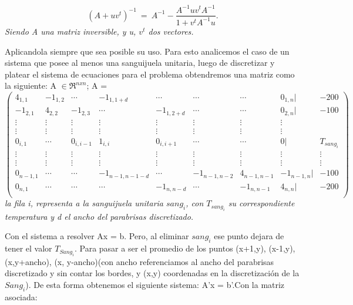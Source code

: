 \begin{equation}
	(A+ uv^t)^{-1} \ =\ A^{-1} - \frac{ A^{-1} u v^t A^{-1} }{1+v^t A^{-1}u}.\label{eq:sm}
\end{equation} 
\textit{Siendo A una matriz inversible, y u, $v^t$ dos vectores.}


Aplicandola siempre que sea posible su uso. Para esto analicemos el caso de un sistema que posee al menos una sanguijuela unitaria, luego de discretizar y platear el sistema de ecuaciones para el problema obtendremos una matriz como la siguiente:
A $\in \Re ^{nxn}$; A =
$$
 \begin{pmatrix}
  4_{1,1} & -1_{1,2} & \cdots & -1_{1,1+d} & \cdots & \cdots & \cdots & 0_{1,n} | & -200 \\
   -1_{2,1} & 4_{2,2} & -1_{2,3} & \cdots & -1_{1,2+d} & \cdots & \cdots  & 0_{2,n} | & -100 \\
  \vdots  & \vdots  & \vdots & \vdots  & \vdots & \vdots  & \vdots & \vdots \\
  \vdots  & \vdots & \vdots & \vdots  & \vdots & \vdots  & \vdots & \vdots \\
   0_{i,1} & \cdots & 0_{i,i-1} & 1_{i,i} &  0_{i,i+1} & \cdots & \cdots & 0 | & T_{sang_i} \\
  \vdots  & \vdots  & \vdots & \vdots  & \vdots  & \vdots  & \vdots & \vdots & \vdots\\
  \vdots  & \vdots  & \vdots & \vdots  & \vdots  & \vdots  & \vdots & \vdots & \vdots\\
   0_{n-1,1} & \cdots & \cdots & -1_{n-1,n-1-d} & \cdots & -1_{n-1,n-2} & 4_{n-1,n-1} &  -1_{n-1,n} | & -100 \\
   0_{n,1} & \cdots & \cdots & \cdots & -1_{n,n-d} & \cdots & -1_{n,n-1} &  4_{n,n} | & -200 \\
 \end{pmatrix}
$$
\textit{la fila i, representa a la sanguijuela unitaria $sang_i$, con $T_{sang_i}$ su correspondiente temperatura y d el ancho del parabrisas discretizado.}\newline

Con el sistema a resolver Ax = b.\newline
Pero, al eliminar $sang_i$ ese punto dejara de tener el valor $T_{Sang_i}$. Para pasar a ser el promedio de los puntos (x+1,y), (x-1,y), (x,y+ancho), (x, y-ancho)(con ancho referenciamos al ancho del parabrisas discretizado y sin contar los bordes,  y (x,y) coordenadas en la discretizaci\'on de la $Sang_i$). De esta forma obtenemos el siguiente sistema: A'x = b'.\newline Con la matriz asociada:

